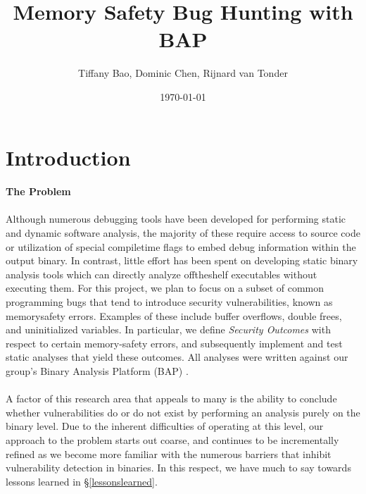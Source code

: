 \documentclass[letterpaper,11pt]{article}
\begin{document}
\date{\today}

\title{\Large \bf Memory Safety Bug Hunting with BAP} 

\author{Tiffany Bao, Dominic Chen, Rijnard van Tonder}

\maketitle

\section{Introduction}
\label{intro}

\paragraph{The Problem}

\paragraph{}
Although numerous debugging tools have been developed for performing static and
dynamic software analysis, the majority of these require access to source
code or utilization of special compile­time flags to embed debug information
within the output binary. In contrast, little effort has been spent on
developing static binary analysis tools which can directly analyze
off­the­shelf executables without executing them. For this project, we plan to
focus on a subset of common programming bugs that tend to introduce security
vulnerabilities, known as memory­safety errors. Examples of these include
buffer overflows, double frees, and uninitialized variables. In particular, we
define \emph{Security Outcomes} with respect to certain memory-safety errors,
and subsequently implement and test static analyses that yield these outcomes.
All analyses were written against our group's Binary Analysis Platform
(BAP) \cite{bap, brumley2011bap}.

\paragraph{}
A factor of this research area that appeals to many is the ability to
conclude whether vulnerabilities do or do not exist by performing
an analysis purely on the binary level. Due to the inherent difficulties
of operating at this level, %
our approach to the problem starts out coarse, and continues to be
incrementally refined as we become more familiar with the numerous
barriers that inhibit vulnerability detection in binaries. In this respect,
we have much to say towards lessons learned in \S\ref{lessonslearned}.
\end{document}
